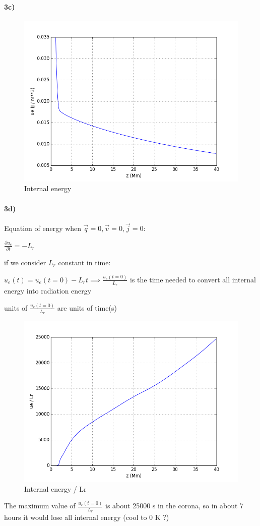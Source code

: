 \documentclass[10pt]{book}
\begin{document}
\paragraph{3c)}

\begin{figure}[H]
 \centering
 \includegraphics[scale=0.5]{ue.png}
 \caption{ Internal energy}
\end{figure}

\paragraph{3d)}
Equation of energy when $\vec{q} = 0, \vec{v} = 0, \vec{j} = 0$:

$ \frac{\partial u_e}{\partial t} = -L_r$

if we consider $L_r$ constant in time:

$u_e(t) = u_e(t=0) - L_r t \implies \frac{u_e(t=0)}{L_r}$ is the time needed to convert all internal energy into radiation energy

units of $\frac{u_e(t=0)}{L_r}$ are units of time(s)

\begin{figure}[H]
 \centering
 \includegraphics[scale=0.5]{ueDivLr.png}
 \caption{ Internal energy / Lr}
\end{figure}

The maximum value of $\frac{u_e(t=0)}{L_r} $ is about 25000 s in the corona, so in about 7 hours it would lose all internal energy (cool to 0 K ?)
\end{document}
